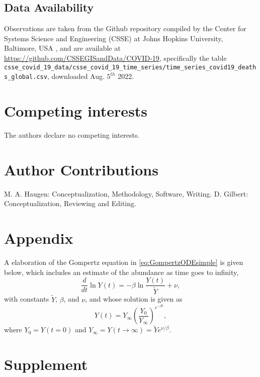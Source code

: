\documentclass{article}
\begin{document}
\subsection*{Data Availability}
Observations are taken from the Github repository compiled by the Center for Systems Science and Engineering (CSSE) at Johns Hopkins University, Baltimore,
USA \cite{dong2020interactive}, and are available at \url{https://github.com/CSSEGISandData/COVID-19}, specifically the table \newline\verb|csse_covid_19_data/csse_covid_19_time_series/time_series_covid19_deaths_global.csv|, \newline downloaded Aug. $5^{th}$ 2022.

\section*{Competing interests}
The authors declare no competing interests.

\section*{Author Contributions}
M. A. Haugen: Conceptualization, Methodology, Software, Writing. D. Gilbert: Conceptualization, Reviewing and Editing.

\section*{Appendix}
A elaboration of the Gompertz equation in \ref{eq:GompertzODEsimple} is given below, which includes an estimate of the abundance as time goes to infinity,
\begin{equation}
\label{eq:GompertzODE}
\frac{d}{dt}\ln{Y(t)} = -\beta\ln{\frac{Y(t)}{\tilde{Y}}} + \nu,
\end{equation} 
with constants $\tilde{Y}$, $\beta$, and $\nu$, and whose solution is given as
\begin{equation}
\label{eq:gomp_solution}
Y(t) = Y_\infty \left(\frac{Y_0}{Y_\infty}\right)^{e^{-\beta t}},
\end{equation}
where $Y_{0}=Y(t = 0)$ and $Y_{\infty}=Y(t\rightarrow \infty)=\tilde{Y}e^{\nu/\beta}$. 

\section*{Supplement}
\end{document}
